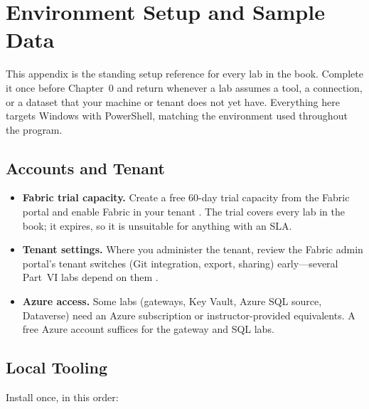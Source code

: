 \chapter{Environment Setup and Sample Data}
%
This appendix is the standing setup reference for every lab in the book. Complete it once
before Chapter~0 and return whenever a lab assumes a tool, a connection, or a dataset that
your machine or tenant does not yet have. Everything here targets Windows with PowerShell,
matching the environment used throughout the program.

\section{Accounts and Tenant}
%
\begin{itemize}
    \item \textbf{Fabric trial capacity.} Create a free 60-day trial capacity from the Fabric portal
    and enable Fabric in your tenant \cite{microsoftFabricTrial}. The trial covers every lab in the
    book; it expires, so it is unsuitable for anything with an SLA.
    \item \textbf{Tenant settings.} Where you administer the tenant, review the Fabric admin portal's
    tenant switches (Git integration, export, sharing) early---several Part~VI labs depend on them
    \cite{microsoftFabricTenantSettings}.
    \item \textbf{Azure access.} Some labs (gateways, Key Vault, Azure SQL source, Dataverse) need an
    Azure subscription or instructor-provided equivalents. A free Azure account suffices for the
    gateway and SQL labs.
\end{itemize}

\section{Local Tooling}
%
Install once, in this order:

